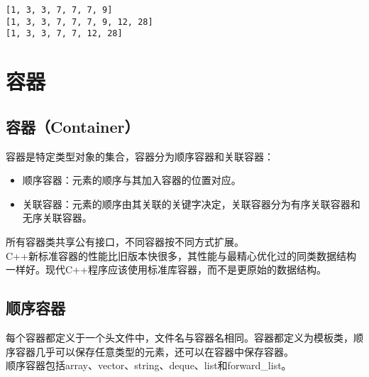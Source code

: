 \begin{tcolorbox}
	\begin{verbatim}
[1, 3, 3, 7, 7, 7, 9] 
[1, 3, 3, 7, 7, 7, 9, 12, 28]
[1, 3, 3, 7, 7, 12, 28]
	\end{verbatim}
\end{tcolorbox}

\newpage

\section{容器}

\subsection{容器（Container）}

容器是特定类型对象的集合，容器分为顺序容器和关联容器：

\begin{itemize}
	\item 顺序容器：元素的顺序与其加入容器的位置对应。
	\item 关联容器：元素的顺序由其关联的关键字决定，关联容器分为有序关联容器和无序关联容器。
\end{itemize}

所有容器类共享公有接口，不同容器按不同方式扩展。 \\

C++新标准容器的性能比旧版本快很多，其性能与最精心优化过的同类数据结构一样好。现代C++程序应该使用标准库容器，而不是更原始的数据结构。

\subsection{顺序容器}

每个容器都定义于一个头文件中，文件名与容器名相同。容器都定义为模板类，顺序容器几乎可以保存任意类型的元素，还可以在容器中保存容器。 \\

顺序容器包括array、vector、string、deque、list和forward\_list。

\begin{table}[H]
	\centering
	\caption{顺序容器}
\end{table}

